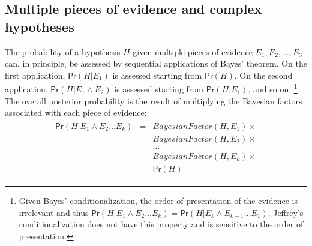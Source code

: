 \documentclass{article}
\newcommand{\pr}{\mathsf{Pr}}
\begin{document}
 
 \subsection{Multiple pieces of evidence and complex hypotheses}
 
%
The probability of a hypothesis $H$ given multiple pieces of evidence $E_1, E_2, \dots, E_3$ can, in principle, be assessed by sequential applications of Bayes' theorem.
On the first application,  $\pr(H \vert E_1)$ is assessed starting from $\pr(H)$.  On the second application,
 $\pr(H \vert E_1 \wedge E_2)$ is assessed starting from $\pr(H \vert E_1)$,  and so on.%
 \footnote{Given Bayes' conditionalization, the order of presentation of the evidence is irrelevant and thus $\pr(H \vert E_1\wedge E_2  \dots E_k)=\pr(H \vert E_k \wedge E_{k-1}\dots E_1)$.  %
 Jeffrey's conditionalization %
does not have this property and is sensitive to the order of presentation.
}
 The overall posterior probability is the result of multiplying the Bayesian factors associated with each piece of evidence:
%
\begin{align*}
\begin{array}{lcl}
\pr(H \vert E_1 \wedge E _2 \dots E_k) & = & \textit{BayesianFactor}(H, E_1) \times \\  
&  & \textit{BayesianFactor}(H, E_2)\times  \\
&  & \dots \\
&  & \textit{BayesianFactor}(H, E_k) \times \\
& &  \pr(H)
\end{array}
\end{align*}
\end{document}
